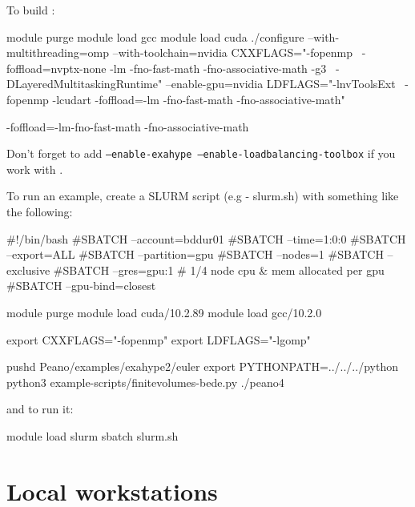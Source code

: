 To build \Peano:
\begin{code}
module purge
module load gcc
module load cuda
./configure --with-multithreading=omp --with-toolchain=nvidia CXXFLAGS="-fopenmp \ 
  -foffload=nvptx-none -lm -fno-fast-math -fno-associative-math -g3 \
  -DLayeredMultitaskingRuntime" --enable-gpu=nvidia  LDFLAGS="-lnvToolsExt \
  -fopenmp -lcudart -foffload=-lm -fno-fast-math -fno-associative-math"
\end{code}


-foffload=-lm-fno-fast-math -fno-associative-math


\noindent
Don't forget to add \texttt{--enable-exahype --enable-loadbalancing-toolbox} if
you work with \ExaHyPE.

To run an example, create a SLURM script (e.g - slurm.sh) with something like the following:
\begin{code}
#!/bin/bash
#SBATCH --account=bddur01
#SBATCH --time=1:0:0
#SBATCH --export=ALL
#SBATCH --partition=gpu
#SBATCH --nodes=1
#SBATCH --exclusive
#SBATCH --gres=gpu:1  # 1/4 node cpu & mem allocated per gpu
#SBATCH --gpu-bind=closest

 module purge
 module load cuda/10.2.89
 module load gcc/10.2.0

 export CXXFLAGS="-fopenmp"
 export LDFLAGS="-lgomp"

 pushd Peano/examples/exahype2/euler
 export PYTHONPATH=../../../python
 python3 example-scripts/finitevolumes-bede.py
 ./peano4
\end{code}

and to run it:
\begin{code}
  module load slurm
  sbatch slurm.sh
\end{code}

\section{Local workstations}




